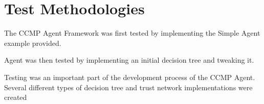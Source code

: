 \section{Test Methodologies}
The CCMP Agent Framework was first tested by implementing the Simple Agent
example provided.

Agent was then tested by implementing an initial decision tree and tweaking it.


Testing was an important part of the development process of the CCMP Agent. 
Several different types of decision tree and trust network implementations were
created
